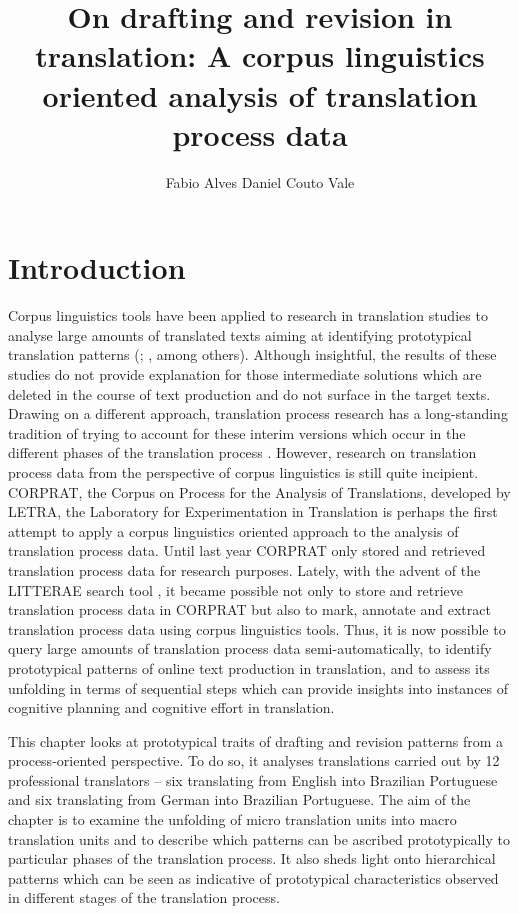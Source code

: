 \documentclass[output=paper]{LSP/langsci}
\author{Fabio Alves\affiliation{Federal Univeristy of Minas Gerais} 
 \lastand Daniel Couto Vale\affiliation{Federal Univeristy of Minas Gerais}
}
\title{On drafting and revision in translation: A corpus linguistics oriented analysis of translation process data}
\begin{document}

\section{Introduction}\label{sec:alves:1}
\largerpage
Corpus linguistics tools have been applied to research in translation studies to analyse large amounts of translated texts aiming at identifying prototypical translation patterns (\citealt{OlohanEtAl2000}; \citealt{HansenEtAl2007}, among others). Although insightful, the results of these studies do not provide explanation for those intermediate solutions which are deleted in the course of text production and do not surface in the target texts. Drawing on a different approach, translation process research has a long-standing tradition of trying to account for these interim versions which occur in the different phases of the translation process \citep{Alves2007}. However, research on translation process data from the perspective of corpus linguistics is still quite incipient. CORPRAT, the Corpus on Process for the Analysis of Translations, developed by LETRA, the Laboratory for Experimentation in Translation \citep{PaganoEtAl2004} is perhaps the first attempt to apply a corpus linguistics oriented approach to the analysis of translation process data. Until last year CORPRAT only stored and retrieved translation process data for research purposes. Lately, with the advent of the LITTERAE search tool \citep{AlvesVale2009}, it became possible not only to store and retrieve translation process data in CORPRAT but also to mark, annotate and extract translation process data using corpus linguistics tools. Thus, it is now possible to query large amounts of translation process data semi-automatically, to identify prototypical patterns of online text production in translation, and to assess its unfolding in terms of sequential steps which can provide insights into instances of cognitive planning and cognitive effort in translation. 

This chapter looks at prototypical traits of drafting and revision patterns from a process-oriented perspective. To do so, it analyses translations carried out by 12 professional translators -- six translating from English into Brazilian Portuguese and six translating from German into Brazilian Portuguese. The aim of the chapter is to examine the unfolding of micro translation units into macro translation units \citep{AlvesVale2009,AlvesEtAl2010} and to describe which patterns can be ascribed prototypically to particular phases of the translation process. It also sheds light onto hierarchical patterns which can be seen as indicative of prototypical characteristics observed in different stages of the translation process.
\end{document}
